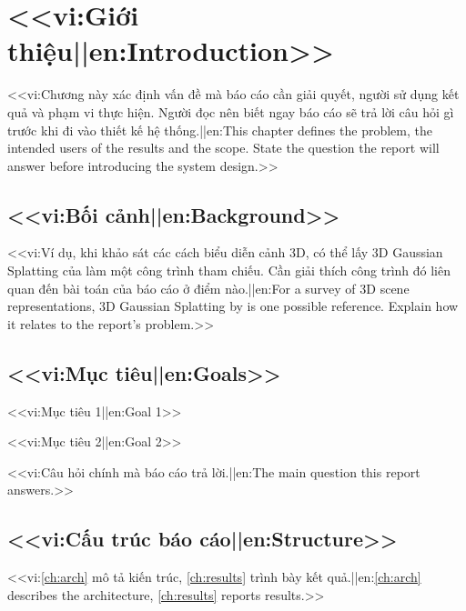 \chapter{<<vi:Giới thiệu||en:Introduction>>}
\label{ch:intro}
<<vi:Chương này xác định vấn đề mà báo cáo cần giải quyết, người sử dụng kết quả và phạm vi thực hiện. Người đọc nên biết ngay báo cáo sẽ trả lời câu hỏi gì trước khi đi vào thiết kế hệ thống.||en:This chapter defines the problem, the intended users of the results and the scope. State the question the report will answer before introducing the system design.>>

\section{<<vi:Bối cảnh||en:Background>>}
<<vi:Ví dụ, khi khảo sát các cách biểu diễn cảnh 3D, có thể lấy 3D Gaussian Splatting của \citet{kerbl2023gaussian} làm một công trình tham chiếu. Cần giải thích công trình đó liên quan đến bài toán của báo cáo ở điểm nào.||en:For a survey of 3D scene representations, 3D Gaussian Splatting by \citet{kerbl2023gaussian} is one possible reference. Explain how it relates to the report’s problem.>>

\section{<<vi:Mục tiêu||en:Goals>>}
\begin{checklist}
  \item <<vi:Mục tiêu 1||en:Goal 1>>
  \item <<vi:Mục tiêu 2||en:Goal 2>>
\end{checklist}

\begin{keyidea}
<<vi:Câu hỏi chính mà báo cáo trả lời.||en:The main question this report answers.>>
\end{keyidea}

\section{<<vi:Cấu trúc báo cáo||en:Structure>>}
<<vi:\cref{ch:arch} mô tả kiến trúc, \cref{ch:results} trình bày kết quả.||en:\cref{ch:arch} describes the architecture, \cref{ch:results} reports results.>>

